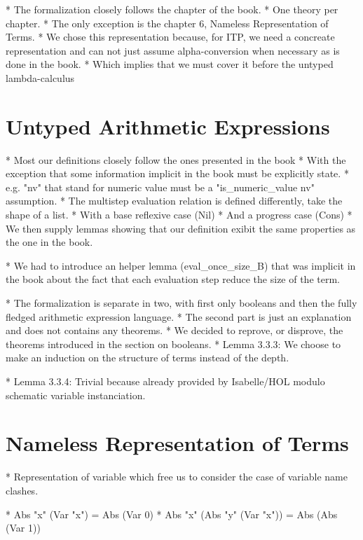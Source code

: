 \documentclass[a4paper, oneside, 12pt, titlepage]{article}
\begin{document}
  * The formalization closely follows the chapter of the book.
    * One theory per chapter.
    * The only exception is the chapter 6, Nameless Representation of Terms.
      * We chose this representation because, for ITP, we need a concreate representation and can
        not just assume alpha-conversion when necessary as is done in the book.
      * Which implies that we must cover it before the untyped lambda-calculus

\section{Untyped Arithmetic Expressions}
\label{sec:untyped-arith-expr}

  * Most our definitions closely follow the ones presented in the book
    * With the exception that some information implicit in the book must be explicitly state.
      * e.g. "nv" that stand for numeric value must be a "is\_numeric\_value nv" assumption.
    * The multistep evaluation relation is defined differently, take the shape of a list.
      * With a base reflexive case (Nil)
      * And a progress case (Cons)
      * We then supply lemmas showing that our definition exibit the same properties as the one in
        the book.

  * We had to introduce an helper lemma (eval\_once\_size\_B) that was implicit in the book about the
    fact that each evaluation step reduce the size of the term.

  * The formalization is separate in two, with first only booleans and then the fully fledged
    arithmetic expression language.
    * The second part is just an explanation and does not contains any theorems.
      * We decided to reprove, or disprove, the theorems introduced in the section on booleans.
  * Lemma 3.3.3: We choose to make an induction on the structure of terms instead of the depth.

  * Lemma 3.3.4: Trivial because already provided by Isabelle/HOL modulo schematic variable
    instanciation.

\section{Nameless Representation of Terms}
\label{sec:nameless-rep-of-terms}

  * Representation of variable which free us to consider the case of variable name clashes.

  * Abs "x" (Var "x") = Abs (Var 0)
  * Abs "x" (Abs "y" (Var "x")) = Abs (Abs (Var 1))
\end{document}
